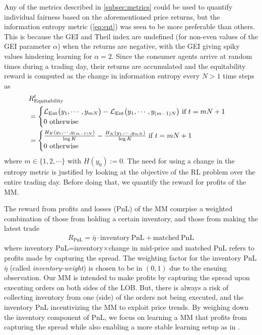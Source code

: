 \documentclass[sigconf]{acmart}
\begin{document}
Any of the metrics described in \ref{subsec:metrics} could be used to quantify individual fairness based on the aforementioned price returns, but the information entropy metric (\ref{eq:ent}) was seen to be more preferable than others. This is because the GEI and Theil index are undefined (for non-even values of the GEI parameter $\alpha$) when the returns are negative, with the GEI giving spiky values hindering learning for $\alpha=2$. Since the consumer agents arrive at random times during a trading day, their returns are accumulated and the equitability reward is computed as the change in information entropy every $N>1$ time steps as
\begin{align}
&R_\mathrm{Equitability}^t\nonumber\\
&=\begin{cases}\mathcal{L}_{\mathrm{Ent}}\big(y_1,\cdots,y_{mN}\big)-\mathcal{L}_{\mathrm{Ent}}\big(y_1,\cdots,y_{(m-1)N}\big)\textnormal{ if }t=mN+1\\
    0\textnormal{ otherwise}\end{cases}\nonumber\\
&=\begin{cases}
    \frac{H_K(y_1,\cdots,y_{(m-1)N})}{\log K}-\frac{H_K(y_1,\cdots,y_{mN})}{\log K}
    \textnormal{ if }t=mN+1\\
    0\textnormal{ otherwise}
    \end{cases}\label{eq:r_fairness}  
\end{align}
where $m\in\lbrace1,2,\cdots\rbrace$ with $H(y_0):=0$. The need for using a change in the entropy metric is justified by looking at the objective of the RL problem over the entire trading day. Before doing that, we quantify the reward for profits of the MM.

The reward from profits and losses (PnL) of the MM comrpise a weighted combination of those from holding a certain inventory, and those from making the latest trade\begin{align}
    R_{\mathrm{PnL}}=\bar\eta\cdot \mathrm{inventory\ PnL}+\mathrm{matched\ PnL}\label{eq:r_pnl}
\end{align}
where inventory PnL=inventory$\times$change in mid-price and matched PnL refers to profits made by capturing the spread. The weighting factor for the inventory PnL $\bar\eta$ (called \textit{inventory-weight}) is chosen to be in $(0,1)$ due to the ensuing observation. Our MM is intended to make profits by capturing the spread upon executing orders on both sides of the LOB. But, there is always a risk of collecting inventory from one (side) of the orders not being executed, and the inventory PnL incentivizing the MM to exploit price trends. By weighing down the inventory component of PnL, we focus on learning a MM that profits from capturing the spread while also enabling a more stable learning setup as in \cite{SpoonerMarketMaking}.
\end{document}
